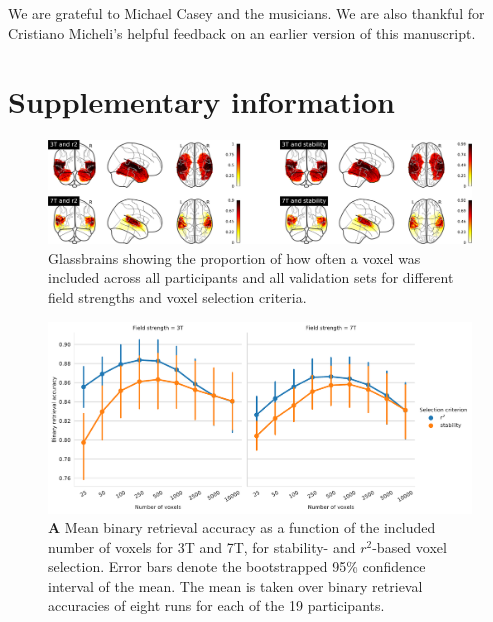 We are grateful to Michael Casey and the musicians.
We are also thankful for Cristiano Micheli's helpful feedback on an earlier version of this manuscript.



\beginsupplement
\newpage
\section*{Supplementary information} \label{supplemental}

\begin{figure}[H]
  \centering
  \includegraphics[width=\linewidth]{pics/glassbrains.png}
  \caption{Glassbrains showing the proportion of how often a voxel was included across all participants and all validation sets for different field strengths and voxel selection criteria.}

 \label{fig:glassbrains}\end{figure}


\begin{figure}[H]
  \centering
  \includegraphics[width=\linewidth]{pics/binary_selection.pdf}
	
  \caption{\textbf{A} Mean binary retrieval accuracy as a function of the
  included number of voxels for 3T and 7T, for stability- and $r^2$-based
  voxel selection. Error bars denote the bootstrapped 95\% confidence interval
  of the mean. The mean is taken over binary retrieval accuracies of eight runs
  for each of the 19 participants.
}

 \label{fig:binary_retrieval_selection}\end{figure}

